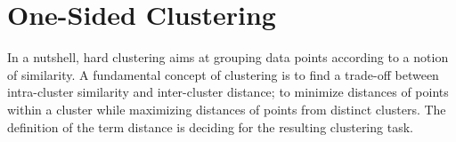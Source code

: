 \section{One-Sided Clustering}\label{sec:ZS:onesided}
In a nutshell, hard clustering aims at grouping data points according to a notion of similarity. A fundamental concept of clustering is to find a trade-off between intra-cluster similarity and inter-cluster distance; to minimize distances of points within a cluster while maximizing distances of points from distinct clusters. The definition of the term distance is deciding for the resulting clustering task. 
\begin{table}%
	\centering
    \caption{The matrix factorization objectives of one-sided clustering.}
\label{tbl:oneSided}
\end{table}
